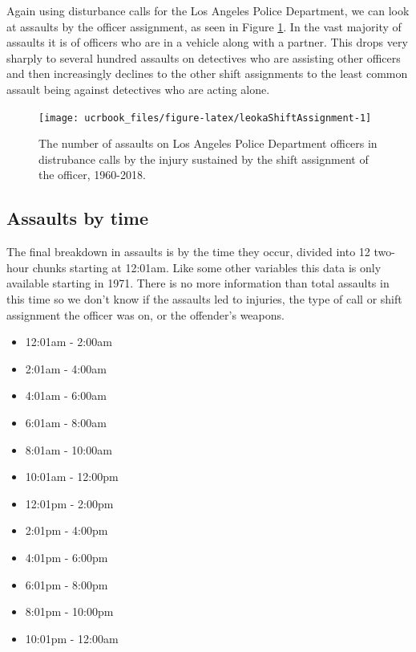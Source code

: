 \documentclass[
  12pt,
  openany]{book}
\providecommand{\tightlist}{%
  \setlength{\itemsep}{0pt}\setlength{\parskip}{0pt}}
\begin{document}
Again using disturbance calls for the Los Angeles Police Department, we can look at assaults by the officer assignment, as seen in Figure \ref{fig:leokaShiftAssignment}. In the vast majority of assaults it is of officers who are in a vehicle along with a partner. This drops very sharply to several hundred assaults on detectives who are assisting other officers and then increasingly declines to the other shift assignments to the least common assault being against detectives who are acting alone.

\begin{figure}

{\centering \texttt{[image: ucrbook\_files/figure-latex/leokaShiftAssignment-1]} 

}

\caption{The number of assaults on Los Angeles Police Department officers in distrubance calls by the injury sustained by the shift assignment of the officer, 1960-2018.}\label{fig:leokaShiftAssignment}
\end{figure}

\hypertarget{assaults-by-time}{%
\subsection{Assaults by time}\label{assaults-by-time}}

The final breakdown in assaults is by the time they occur, divided into 12 two-hour chunks starting at 12:01am. Like some other variables this data is only available starting in 1971. There is no more information than total assaults in this time so we don't know if the assaults led to injuries, the type of call or shift assignment the officer was on, or the offender's weapons.

\begin{itemize}
\tightlist
\item
  12:01am - 2:00am
\item
  2:01am - 4:00am
\item
  4:01am - 6:00am
\item
  6:01am - 8:00am
\item
  8:01am - 10:00am
\item
  10:01am - 12:00pm
\item
  12:01pm - 2:00pm
\item
  2:01pm - 4:00pm
\item
  4:01pm - 6:00pm
\item
  6:01pm - 8:00pm
\item
  8:01pm - 10:00pm
\item
  10:01pm - 12:00am
\end{itemize}
\end{document}
